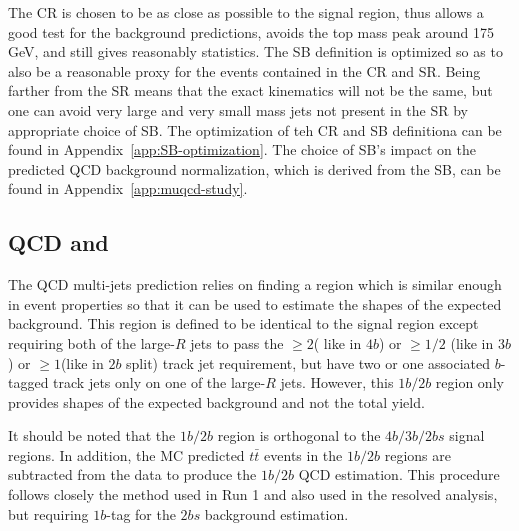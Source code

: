 The CR is chosen to be as close as possible to the signal region, thus allows a good test for the background predictions, avoids the top mass peak around 175 GeV, and still gives reasonably statistics.  The SB definition is optimized so as to also be a reasonable proxy for the events contained in the CR and SR. Being farther from the SR means that the exact kinematics will not be the same, but one can avoid very large and very small mass jets not present in the SR by appropriate choice of SB.   The optimization of teh CR and SB definitiona can be found in Appendix~\ref{app:SB-optimization}. The choice of SB's impact on the predicted QCD background normalization, which is derived from the SB, can be found in Appendix~\ref{app:muqcd-study}.


\pagebreak{}
\subsection{QCD and \ttbar}
\label{sec:boosted-qcd}

The QCD multi-jets prediction relies on finding a region which is similar enough in event properties so that it can be used to estimate the shapes of the expected background. This region is defined to be identical to the signal region except requiring both of the large-$R$ jets to pass the $\geq 2$( like in $4b$) or $\geq 1/2$ (like in $3b$) or $\geq 1$(like in $2b$ split) track jet requirement, but have two or one associated $b$-tagged track jets only on one of the large-$R$ jets. However, this $1b/2b$ region only provides shapes of the expected background and not the total yield. 

It should be noted that the $1b/2b$ region is orthogonal to the $4b/3b/2bs$ signal regions. In addition, the MC predicted $t\bar{t}$ events in the $1b/2b$ regions are subtracted from the data to produce the $1b/2b$ QCD estimation. This procedure follows closely the method used in Run 1 and also used in the resolved analysis, but requiring $1b$-tag for the $2bs$ background estimation.

